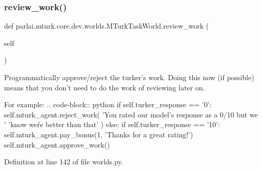 \subsubsection{\texorpdfstring{review\+\_\+work()}{review\_work()}}
{\footnotesize\ttfamily def parlai.\+mturk.\+core.\+dev.\+worlds.\+M\+Turk\+Task\+World.\+review\+\_\+work (\begin{DoxyParamCaption}\item[{}]{self }\end{DoxyParamCaption})}

\begin{DoxyVerb}Programmatically approve/reject the turker's work. Doing this now (if possible)
means that you don't need to do the work of reviewing later on.

For example:
.. code-block:: python
    if self.turker_response == '0':
self.mturk_agent.reject_work(
    'You rated our model's response as a 0/10 but we '
    'know we\'re better than that'
)
    else:
if self.turker_response == '10':
    self.mturk_agent.pay_bonus(1, 'Thanks for a great rating!')
self.mturk_agent.approve_work()
\end{DoxyVerb}
 

Definition at line 142 of file worlds.\+py.


